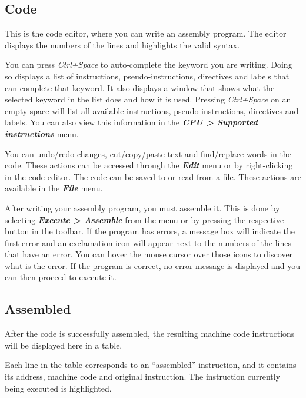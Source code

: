 \documentclass[11pt,a4paper,twoside,titlepage]{article}
\newcommand{\menupath}[1]{\textbf{\emph{#1}}}
\begin{document}
\subsection{Code}

This is the code editor, where you can write an assembly program.
The editor displays the numbers of the lines and highlights the valid syntax.

You can press \emph{Ctrl+Space} to auto-complete the keyword you are writing.
Doing so displays a list of instructions, pseudo-instructions, directives and
labels that can complete that keyword.
It also displays a window that shows what the selected keyword in the list does
and how it is used.
Pressing \emph{Ctrl+Space} on an empty space will list all available
instructions, pseudo-instructions, directives and labels.
You can also view this information in the 
\menupath{CPU > Supported instructions} menu.

You can undo/redo changes, cut/copy/paste text and find/replace words in the
code. These actions can be accessed through the \menupath{Edit} menu or by
right-clicking in the code editor.
The code can be saved to or read from a file. These actions are available in
the \menupath{File} menu.

After writing your assembly program, you must assemble it.
This is done by selecting \menupath{Execute > Assemble} from the menu or by
pressing the respective button in the toolbar.
If the program has errors, a message box will indicate the first error and an
exclamation icon will appear next to the numbers of the lines that have an
error.
You can hover the mouse cursor over those icons to discover what is the error.
If the program is correct, no error message is displayed and you can then
proceed to execute it.


\subsection{Assembled} \label{sec:assembled}

After the code is successfully assembled, the resulting machine code 
instructions will be displayed here in a table.

Each line in the table corresponds to an ``assembled'' instruction, and it
contains its address, machine code and original instruction.
The instruction currently being executed is highlighted.
\end{document}
